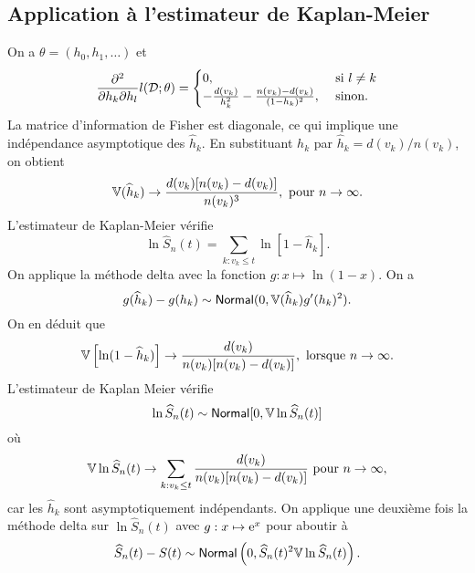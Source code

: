 \subsection{Application à l'estimateur de Kaplan-Meier}
On a $\theta= (h_0,h_1,\ldots)$ et
\begin{equation}\label{eq:partial_derivative_log_like}
\frac{\partial^2 }{\partial h_k\partial h_l} l(\mathcal{D};\theta)=\begin{cases}
0,&\text{ si }l\neq k\\
-\frac{d(v_k)}{h_k^2}-\frac{n(v_k)-d(v_k)}{(1-h_k)^2},&\text{ sinon.}
\end{cases}
\end{equation}
La matrice d'information de Fisher est diagonale, ce qui implique une indépendance asymptotique des $\widehat{h}_{k}$. En substituant $h_k$ par $\widehat{h}_k = d(v_k)/n(v_k)$, on obtient 
$$
\mathbb{V}(\widehat{h}_k)\rightarrow \frac{d(v_k)[n(v_k)-d(v_k)]}{n(v_k)^3},\text{ pour }n\rightarrow \infty.
$$
L'estimateur de Kaplan-Meier vérifie
$$
\ln\widehat{S}_n(t)=\sum_{k:v_k\leq t}\ln\left[1-\widehat{h}_k\right].
$$
On applique la méthode delta avec la fonction $g:x\mapsto \ln(1-x)$. On a 
$$
g(\widehat{h}_k) - g(h_k)\sim \mathsf{Normal}(0,\mathbb{V}(\widehat{h}_k)g'(h_k)^2
).
$$
On en déduit que 
$$
\mathbb{V}\left[\ln(1-\widehat{h}_k)\right]\rightarrow \frac{d(v_k)}{n(v_k)[n(v_k) - d(v_k)]},\text{ lorsque }n\rightarrow\infty.
$$
L'estimateur de Kaplan Meier vérifie
$$
\ln\widehat{S}_n(t)\sim\mathsf{Normal}[0, \mathbb{V}\ln\widehat{S}_n(t)]
$$
où
$$
\mathbb{V}\ln\widehat{S}_n(t)\rightarrow \sum_{k:v_k\leq t}\frac{d(v_k)}{n(v_k)[n(v_k) - d(v_k)]}\text{ pour }n\rightarrow\infty,
$$
car les $\widehat{h}_k$ sont asymptotiquement indépendants. On applique une deuxième fois la méthode delta sur $\ln\widehat{S}_n(t)$ avec $g:x\mapsto \mathrm{e}^x$ pour aboutir à 
$$
\widehat{S}_n(t) - S(t)\sim \mathsf{Normal}\left(0,\widehat{S}_n(t)^2\mathbb{V}\ln\widehat{S}_n(t)
\right).
$$
